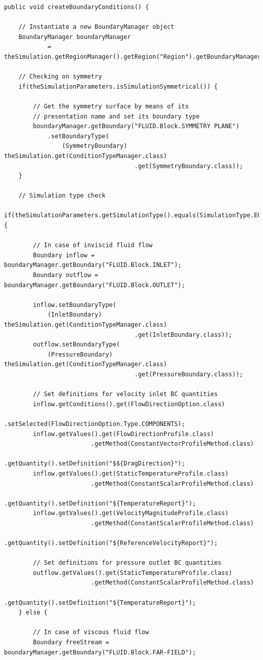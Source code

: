\begin{lstlisting}[caption={\lstinline!createBoundaryConditions! method}, captionpos=b, tabsize=2, label={lst:CreateBoundaryConditions}]
public void createBoundaryConditions() {
	
	// Instantiate a new BoundaryManager object
	BoundaryManager boundaryManager 
			= theSimulation.getRegionManager().getRegion("Region").getBoundaryManager();

	// Checking on symmetry		
	if(theSimulationParameters.isSimulationSymmetrical()) {
	
		// Get the symmetry surface by means of its 
		// presentation name and set its boundary type
		boundaryManager.getBoundary("FLUID.Block.SYMMETRY PLANE")
			.setBoundaryType(
				(SymmetryBoundary) theSimulation.get(ConditionTypeManager.class)
									.get(SymmetryBoundary.class));
	}
		
	// Simulation type check	
	if(theSimulationParameters.getSimulationType().equals(SimulationType.EULER)) {
	
		// In case of inviscid fluid flow		
		Boundary inflow = boundaryManager.getBoundary("FLUID.Block.INLET");
		Boundary outflow = boundaryManager.getBoundary("FLUID.Block.OUTLET");

		inflow.setBoundaryType(
			(InletBoundary) theSimulation.get(ConditionTypeManager.class)
									.get(InletBoundary.class));		
		outflow.setBoundaryType(
			(PressureBoundary) theSimulation.get(ConditionTypeManager.class)
									.get(PressureBoundary.class));
									
		// Set definitions for velocity inlet BC quantities
		inflow.getConditions().get(FlowDirectionOption.class)
						.setSelected(FlowDirectionOption.Type.COMPONENTS);
		inflow.getValues().get(FlowDirectionProfile.class)
						.getMethod(ConstantVectorProfileMethod.class)
						.getQuantity().setDefinition("$${DragDirection}");
		inflow.getValues().get(StaticTemperatureProfile.class)
						.getMethod(ConstantScalarProfileMethod.class)
						.getQuantity().setDefinition("${TemperatureReport}");
		inflow.getValues().get(VelocityMagnitudeProfile.class)
						.getMethod(ConstantScalarProfileMethod.class)
						.getQuantity().setDefinition("${ReferenceVelocityReport}");
		
		// Set definitions for pressure outlet BC quantities
		outflow.getValues().get(StaticTemperatureProfile.class)
						.getMethod(ConstantScalarProfileMethod.class)
						.getQuantity().setDefinition("${TemperatureReport}");
	} else {
	
		// In case of viscous fluid flow
		Boundary freeStream = boundaryManager.getBoundary("FLUID.Block.FAR-FIELD");


\end{lstlisting}
